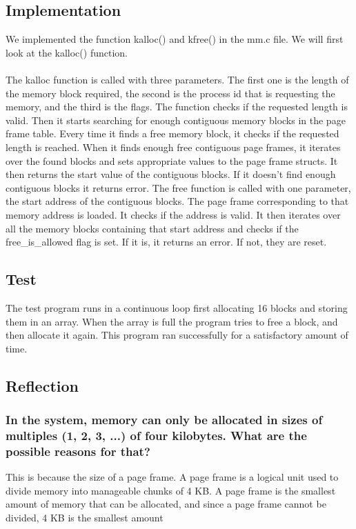 \subsection{Implementation}
We implemented the function kalloc() and kfree() in the mm.c file. We will first look at the kalloc() function.\\\\
The kalloc function is called with three parameters. The first one is the length of the memory block required, the second is the process id that is requesting the memory, and the third is the flags. The function checks if the requested length is valid. Then it starts searching for enough contiguous memory blocks in the page frame table. Every time it finds a free memory block, it checks if the requested length is reached. When it finds enough free contiguous page frames, it iterates over the found blocks and sets appropriate values to the page frame structs. It then returns the start value of the contiguous blocks. If it doesn’t find enough contiguous blocks it returns error.
The free function is called with one parameter, the start address of the contiguous blocks. The page frame corresponding to that memory address is loaded. It checks if the address is valid. It then iterates over all the memory blocks containing that start address and checks if the free\_is\_allowed flag is set. If it is, it returns an error. If not, they are reset.

\subsection{Test}
The test program runs in a continuous loop first allocating 16 blocks and storing them in an array. When the array is full the program tries to free a block, and then allocate it again. This program ran successfully for a satisfactory amount of time.

\subsection{Reflection}

\subsubsection*{In the system, memory can only be allocated in sizes of multiples (1, 2, 3, ...) of four kilobytes. What are the possible reasons for that?}
This is because the size of a page frame. A page frame is a logical unit used to divide memory into manageable chunks of 4 KB. A page frame is the smallest amount of memory that can be allocated, and since a page frame cannot be divided, 4 KB is the smallest amount

